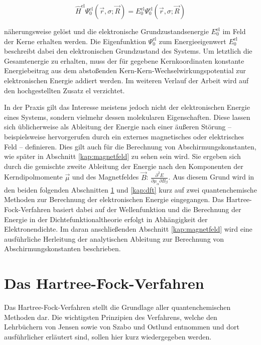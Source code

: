 \begin{equation}
  \hat{H}^{\text{el}}\Psi^{\text{el}}_0(\vec{r},\sigma;\vec{R})=E^{\text{el}}_0\Psi^{\text{el}}_0(\vec{r},\sigma;\vec{R})
\end{equation}

näherungsweise gelöst und die elektronische Grundzustandsenergie $E^{\text{el}}_0$ im Feld der Kerne erhalten werden. Die Eigenfunktion $\Psi^{\text{el}}_0$ zum Energieeigenwert $E^{\text{el}}_0$ beschreibt dabei den elektronischen Grundzustand des Systems. Um letztlich die Gesamtenergie zu erhalten, muss der für gegebene Kernkoordinaten konstante Energiebeitrag aus dem abstoßenden Kern-Kern-Wechselwirkungspotential zur elektronischen Energie addiert werden. Im weiteren Verlauf der Arbeit wird auf den hochgestellten Zusatz \glqq el\grqq{} verzichtet. 

In der Praxis gilt das Interesse meistens jedoch nicht der elektronischen Energie eines Systems, sondern vielmehr dessen molekularen Eigenschaften. Diese lassen sich üblicherweise als Ableitung der Energie nach einer äußeren Störung -- beispielsweise hervorgerufen durch ein externes magnetisches oder elektrisches Feld -- definieren. Dies gilt auch für die Berechnung von Abschirmungskonstanten, wie später in Abschnitt \ref{kap:magnetfeld} zu sehen sein wird. Sie ergeben sich durch die gemischte zweite Ableitung der Energie nach den Komponenten der Kerndipolmomente $\vec{\mu}$ und des Magnetfeldes $\vec{B}$: $\frac{\partial^2 E}{\partial\mu_\alpha\partial B_\beta}$. Aus diesem Grund wird in den beiden folgenden Abschnitten \ref{kap:hartreefock} und \ref{kap:dft} kurz auf zwei quantenchemische Methoden zur Berechnung der elektronischen Energie eingegangen. Das Hartree-Fock-Verfahren basiert dabei auf der Wellenfunktion und die Berechnung der Energie in der Dichtefunktionaltheorie erfolgt in Abhängigkeit der Elektronendichte. Im daran anschließenden Abschnitt \ref{kap:magnetfeld} wird eine ausführliche Herleitung der analytischen Ableitung zur Berechnung von Abschirmungskonstanten beschrieben. 


\section{Das Hartree-Fock-Verfahren}\label{kap:hartreefock}

Das Hartree-Fock-Verfahren stellt die Grundlage aller quantenchemischen Methoden dar. Die wichtigsten Prinzipien des Verfahrens, welche den Lehrbüchern von Jensen\supercite{jensen2009introduction} sowie von Szabo und Ostlund\supercite{szabo1982modern} entnommen und dort ausführlicher erläutert sind, sollen hier kurz wiedergegeben werden. 

